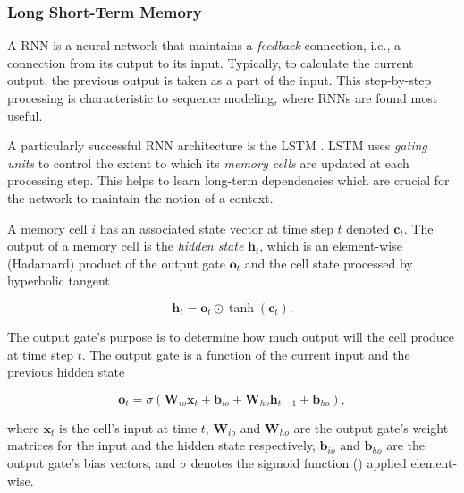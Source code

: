 \subsubsection{Long Short-Term Memory}

A \ac{RNN} is a neural network that maintains a \emph{feedback} connection, i.e., a connection from its output to its input. Typically, to calculate the current output, the previous output is taken as a part of the input. This step-by-step processing is characteristic to sequence modeling, where \acp{RNN} are found most useful.

A particularly successful \ac{RNN} architecture is the \ac{LSTM} \cite{Hochreiter1997}. \ac{LSTM} uses \emph{gating units} to control the extent to which its \emph{memory cells} are updated at each processing step. This helps to learn long-term dependencies which are crucial for the network to maintain the notion of a context.

A memory cell $i$ has an associated state vector at time step $t$ denoted $\pmb{c}_t$. The output of a memory cell is the \emph{hidden state} $\pmb{h}_t$, which is an element-wise (Hadamard) product of the output gate $\pmb{o}_t$ and the cell state processed by hyperbolic tangent

\begin{equation}
  \pmb{h}_t = \pmb{o}_t \odot \tanh (\pmb{c}_t).
  \label{eq:lstm_hidden_state}
\end{equation}

The output gate's purpose is to determine how much output will the cell produce at time step $t$. The output gate is a function of the current input and the previous hidden state

\begin{equation}
  \pmb{o}_t = \sigma (\pmb{W}_{io} \pmb{x}_t + \pmb{b}_{io} + \pmb{W}_{ho} \pmb{h}_{t-1} + \pmb{b}_{ho}),
  \label{eq:lstm_output_gate}
\end{equation}

where $\pmb{x}_t$ is the cell's input at time $t$, $\pmb{W}_{io}$ and $\pmb{W}_{ho}$ are the output gate's weight matrices for the input and the hidden state respectively, $\pmb{b}_{io}$ and $\pmb{b}_{ho}$ are the output gate's bias vectors, and $\sigma$ denotes the sigmoid function () applied element-wise.

